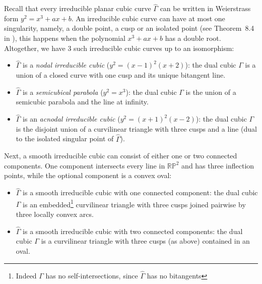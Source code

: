 \documentclass[a4paper,11pt,reqno]{amsart}
\theoremstyle{definition}
\theoremstyle{remark}
\theoremstyle{definition}
\theoremstyle{definition}
\theoremstyle{definition}
\numberwithin{equation}{section}
\begin{document}
Recall that every irreducible planar cubic curve $\hat \Gamma$ can be written in Weierstrass form $y^2=x^3+ax+b$. An irreducible cubic curve 
can have at most one singularity, namely, a double point, a cusp or an isolated point (see Theorem~8.4 in \cite{Bix}), this happens when the polynomial $x^3+ax+b$ has a double root. Altogether, we have $3$ such irreducible cubic curves up to an isomorphism:
\begin{itemize}
    \item $\hat{\Gamma}$ is a \textit{nodal irreducible cubic} ($y^2=(x-1)^2(x+2)$):
    the dual cubic $\Gamma$ is a union of a closed curve with one cusp and its unique bitangent line.
    \item $\hat{\Gamma}$ is a \textit{semicubical parabola} ($y^2=x^3$): the dual cubic $\Gamma$ is the union of a semicubic parabola and the line at infinity.
    \item $\hat{\Gamma}$ is an \textit{acnodal irreducible cubic} ($y^{2}=(x+1)^2(x-2)$): the dual cubic $\Gamma$ is the disjoint union of a curvilinear triangle with three cusps and a line (dual to the isolated singular point of $\hat{\Gamma}$).
\end{itemize}





Next, a smooth irreducible cubic can consist of either one or two connected components. One component intersects every line in $\mathbb{RP}^2$ and has three inflection points, while the optional component is a convex oval:
\begin{itemize}
    \item $\hat{\Gamma}$ is a smooth irreducible cubic with one connected component: 
    the dual cubic $\Gamma$ is an embedded\footnote{Indeed $\Gamma$ has no self-intersections, since $\hat\Gamma$ has no bitangents} curvilinear triangle with three cusps joined pairwise by three locally convex arcs.
    \item $\hat{\Gamma}$ is a smooth irreducible cubic with two connected components: 
    the dual cubic $\Gamma$ is a curvilinear triangle with three cusps (as above) contained in an oval.
\end{itemize}
\end{document}
